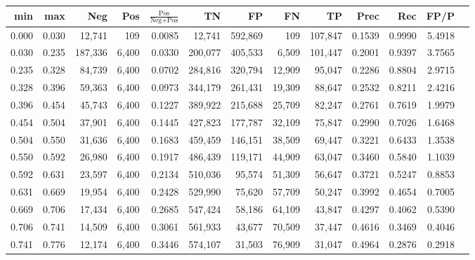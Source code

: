 \begin{tabular}{rrrrrrrrrrrrr}
\toprule
  min &   max &     Neg &    Pos & $\frac{\text{Pos}}{\text{Neg}+\text{Pos}}$ &      TN &      FP &      FN &      TP &   Prec &    Rec &   FP/P \\
\midrule
0.000 & 0.030 &  12,741 &    109 &                                     0.0085 &  12,741 & 592,869 &     109 & 107,847 & 0.1539 & 0.9990 & 5.4918 \\
0.030 & 0.235 & 187,336 &  6,400 &                                     0.0330 & 200,077 & 405,533 &   6,509 & 101,447 & 0.2001 & 0.9397 & 3.7565 \\
0.235 & 0.328 &  84,739 &  6,400 &                                     0.0702 & 284,816 & 320,794 &  12,909 &  95,047 & 0.2286 & 0.8804 & 2.9715 \\
0.328 & 0.396 &  59,363 &  6,400 &                                     0.0973 & 344,179 & 261,431 &  19,309 &  88,647 & 0.2532 & 0.8211 & 2.4216 \\
0.396 & 0.454 &  45,743 &  6,400 &                                     0.1227 & 389,922 & 215,688 &  25,709 &  82,247 & 0.2761 & 0.7619 & 1.9979 \\
0.454 & 0.504 &  37,901 &  6,400 &                                     0.1445 & 427,823 & 177,787 &  32,109 &  75,847 & 0.2990 & 0.7026 & 1.6468 \\
0.504 & 0.550 &  31,636 &  6,400 &                                     0.1683 & 459,459 & 146,151 &  38,509 &  69,447 & 0.3221 & 0.6433 & 1.3538 \\
0.550 & 0.592 &  26,980 &  6,400 &                                     0.1917 & 486,439 & 119,171 &  44,909 &  63,047 & 0.3460 & 0.5840 & 1.1039 \\
0.592 & 0.631 &  23,597 &  6,400 &                                     0.2134 & 510,036 &  95,574 &  51,309 &  56,647 & 0.3721 & 0.5247 & 0.8853 \\
0.631 & 0.669 &  19,954 &  6,400 &                                     0.2428 & 529,990 &  75,620 &  57,709 &  50,247 & 0.3992 & 0.4654 & 0.7005 \\
0.669 & 0.706 &  17,434 &  6,400 &                                     0.2685 & 547,424 &  58,186 &  64,109 &  43,847 & 0.4297 & 0.4062 & 0.5390 \\
0.706 & 0.741 &  14,509 &  6,400 &                                     0.3061 & 561,933 &  43,677 &  70,509 &  37,447 & 0.4616 & 0.3469 & 0.4046 \\
0.741 & 0.776 &  12,174 &  6,400 &                                     0.3446 & 574,107 &  31,503 &  76,909 &  31,047 & 0.4964 & 0.2876 & 0.2918 \\

\end{tabular}
